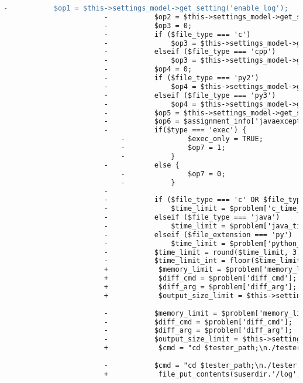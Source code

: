 \begin{lstlisting}[language=diff, caption=Perubahan pada kode Queueprocess.php]
						-			$op1 = $this->settings_model->get_setting('enable_log');
						-			$op2 = $this->settings_model->get_setting('enable_easysandbox');
						-			$op3 = 0;
						-			if ($file_type === 'c')
						-				$op3 = $this->settings_model->get_setting('enable_c_shield');
						-			elseif ($file_type === 'cpp')
						-				$op3 = $this->settings_model->get_setting('enable_cpp_shield');
						-			$op4 = 0;
						-			if ($file_type === 'py2')
						-				$op4 = $this->settings_model->get_setting('enable_py2_shield');
						-			elseif ($file_type === 'py3')
						-				$op4 = $this->settings_model->get_setting('enable_py3_shield');
						-			$op5 = $this->settings_model->get_setting('enable_java_policy');
						-			$op6 = $assignment_info['javaexceptions'];
						-			if($type === 'exec') {
							-				$exec_only = TRUE;
							-				$op7 = 1;
							-			}
						-			else {
							-				$op7 = 0;
							-			}
						-				
						-			if ($file_type === 'c' OR $file_type === 'cpp')
						-				$time_limit = $problem['c_time_limit']/1000;
						-			elseif ($file_type === 'java')
						-				$time_limit = $problem['java_time_limit']/1000;
						-			elseif ($file_extension === 'py')
						-				$time_limit = $problem['python_time_limit']/1000;
						-			$time_limit = round($time_limit, 3);
						-			$time_limit_int = floor($time_limit) + 1;
						+            $memory_limit = $problem['memory_limit'];
						+            $diff_cmd = $problem['diff_cmd'];
						+            $diff_arg = $problem['diff_arg'];
						+            $output_size_limit = $this->settings_model->get_setting('output_size_limit') * 1024;
						
						-			$memory_limit = $problem['memory_limit'];
						-			$diff_cmd = $problem['diff_cmd'];
						-			$diff_arg = $problem['diff_arg'];
						-			$output_size_limit = $this->settings_model->get_setting('output_size_limit') * 1024;
						+            $cmd = "cd $tester_path;\n./tester.sh $problemdir ".escapeshellarg($username).' '.escapeshellarg($main_filename).' '.escapeshellarg($raw_filename)." $file_type $time_limit $time_limit_int $memory_limit $output_size_limit $diff_cmd $diff_arg $op1 $op2 $op3 $op4 $op5 $op6 $op7";
						
						-			$cmd = "cd $tester_path;\n./tester.sh $problemdir ".escapeshellarg($username).' '.escapeshellarg($main_filename).' '.escapeshellarg($raw_filename)." $file_type $time_limit $time_limit_int $memory_limit $output_size_limit $diff_cmd $diff_arg $op1 $op2 $op3 $op4 $op5 $op6 $op7";
						+            file_put_contents($userdir.'/log', $cmd);
						

\end{lstlisting}
